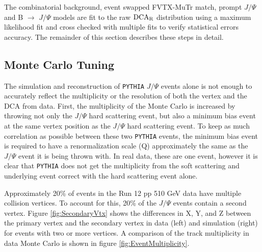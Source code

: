 \documentclass[12pt]{article}
\newcommand{\jpsi}{$J/\Psi$ }
\newcommand{\pythia}{\texttt{PYTHIA} }
\newcommand{\dcar}{$\rm{DCA}_{R}$ }
\begin{document}
The combinatorial background, event swapped FVTX-MuTr match, prompt \jpsi and B $\to$ \jpsi models are fit to the raw \dcar distribution using a
maximum likelihood fit and cross checked with multiple fits to verify statistical errors accuracy. The remainder of this section describes these steps in detail.

\subsection{Monte Carlo Tuning}
\label{sec:MCTuning}


The simulation and reconstruction of \pythia \jpsi events alone is not enough to accurately reflect the multiplicity or the resolution of
both the vertex and the DCA from data.  First, the multiplicity of the Monte Carlo is increased by throwing not only the \jpsi hard scattering event,
but also a minimum bias event at the same vertex position as the \jpsi hard scattering event.  To keep as much correlation as possible between these
two \pythia events, the minimum bias event is required to have a renormalization scale (Q) approximately the same as the \jpsi event it is being thrown 
with.  In real data, these are one event, however it is clear that \pythia does not get the multiplicity from the soft scattering and underlying event correct 
with the hard scattering event alone. 

Approximately 20\% of events in the Run 12 pp 510 GeV data have multiple collision vertices.  To account for this,
20\% of the \jpsi events contain a second vertex. Figure \ref{fig:SecondaryVtx} shows the differences in X, Y, and Z between the primary vertex and the 
secondary vertex in data (left) and simulation (right) for events with two or more vertices. 
A comparison of the track multiplicity in data Monte Carlo is shown in figure \ref{fig:EventMultiplicity}.  


\end{document}
